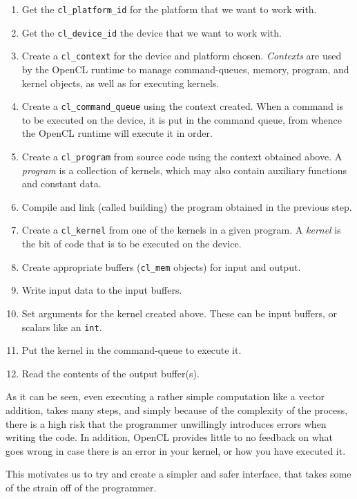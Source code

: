 \begin{enumerate}
  \item Get the \texttt{cl\_platform\_id} for the platform that we
    want to work with.
  \item Get the \texttt{cl\_device\_id} the device that we want to
    work with.
  \item Create a \texttt{cl\_context} for the device and platform
    chosen. \emph{Contexts} are used by the OpenCL runtime to manage
    command-queues, memory, program, and kernel objects, as well as
    for executing kernels.
  \item Create a \texttt{cl\_command\_queue} using the context
    created. When a command is to be executed on the device, it is put
    in the command queue, from whence the OpenCL runtime will
    execute it in order.
  \item Create a \texttt{cl\_program} from source code using the
    context obtained above. A \emph{program} is a collection of
    kernels, which may also contain auxiliary functions and constant
    data.
  \item Compile and link (called building) the program obtained in the
    previous step.
  \item Create a \texttt{cl\_kernel} from one of the kernels in a
    given program. A \emph{kernel} is the bit of code that is to be
    executed on the device.
  \item Create appropriate buffers (\texttt{cl\_mem} objects) for
    input and output.
  \item Write input data to the input buffers.
  \item Set arguments for the kernel created above. These can be input
    buffers, or scalars like an \texttt{int}.
  \item Put the kernel in the command-queue to execute it.
  \item Read the contents of the output buffer(s).
\end{enumerate}

As it can be seen, even executing a rather simple computation like a
vector addition, takes many steps, and simply because of the
complexity of the process, there is a high risk that the
programmer unwillingly introduces errors when writing the code. In
addition, OpenCL provides little to no feedback on what goes wrong in
case there is an error in your kernel, or how you have executed it.

This motivates us to try and create a simpler and safer interface,
that takes some of the strain off of the programmer.
